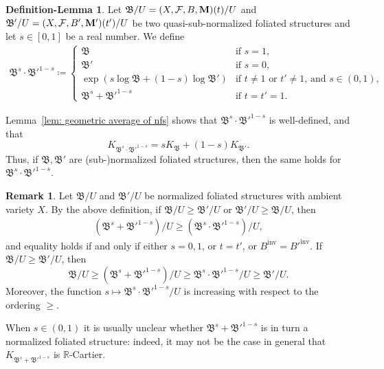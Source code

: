 \documentclass[11pt,reqno]{amsart}
\numberwithin{equation}{section}
\newcommand{\Mm}{{\bf{M}}}
\newcommand{\inv}{\operatorname{inv}}
\newcommand{\Bb}{{\mathfrak{B}}}
\newcommand{\Ff}{\mathcal{F}}
\theoremstyle{definition}
\newtheorem{rem}[thm]{Remark}
\newtheorem{deflem}[thm]{Definition-Lemma}
\begin{document}
\begin{deflem}\label{deflem: nfs geometric average}
Let $\Bb/U=(X,\Ff,B,\Mm)(t)/U$ and $\Bb'/U=(X,\Ff,B',\Mm')(t')/U$ be two quasi-sub-normalized foliated structures and let $s\in [0,1]$ be a real number. We define
\begin{align*}
\Bb^s\cdot\Bb'^{1-s} \coloneqq
\begin{cases}
\Bb
&\text{if $s=1$},\\
\Bb'
&\text{if $s=0$},\\
\exp(s\log\Bb+(1-s)\log\Bb')
&\text{if $t\neq1$ or $t'\neq1$, and $s\in (0,1)$},\\
\Bb^s+\Bb'^{1-s}
&\text{if $t=t'=1$}.
\end{cases}
\end{align*}

Lemma~\ref{lem: geometric average of nfs} shows that $\Bb^s\cdot\Bb'^{1-s}$ is well-defined, and that
\[K_{\Bb^s\cdot\Bb'^{1-s}}=sK_{\Bb}+(1-s)K_{\Bb'}.\]
Thus, if $\Bb,\Bb'$ are (sub-)normalized foliated structures, then the same holds for $\Bb^s\cdot\Bb'^{1-s}$.
\end{deflem}


\begin{rem}
Let 
$\Bb/U$ and $\Bb'/U$ 
be normalized foliated structures with ambient variety $X$. By the above definition, if 
$\Bb/U\geq\Bb'/U$ or $\Bb'/U\geq\Bb/U$, 
then
\begin{align*}
(\Bb^s+\Bb'^{1-s})/U\geq (\Bb^s\cdot\Bb'^{1-s})/U,
\end{align*}
and equality holds if and only if either $s=0, 1$, or $t=t'$, or $B^{\inv}=B'^{\inv}$.
If $\Bb/U\geq\Bb'/U$, then
  \[\Bb/U\geq(\Bb^s+\Bb'^{1-s})/U\geq\Bb^s\cdot\Bb'^{1-s}/U\geq\Bb'/U.\]
Moreover, the function $s\mapsto \Bb^s\cdot\Bb'^{1-s}/U$ is increasing with respect to the ordering $\geq$.

When $s \in (0, 1)$ it is usually unclear whether $\Bb^s+\Bb'^{1-s}$ is in turn a normalized foliated structure: indeed, it may not be the case in general that $K_{\Bb^s+\Bb'^{1-s}}$ is $\mathbb R$-Cartier.
\end{rem}
\end{document}

